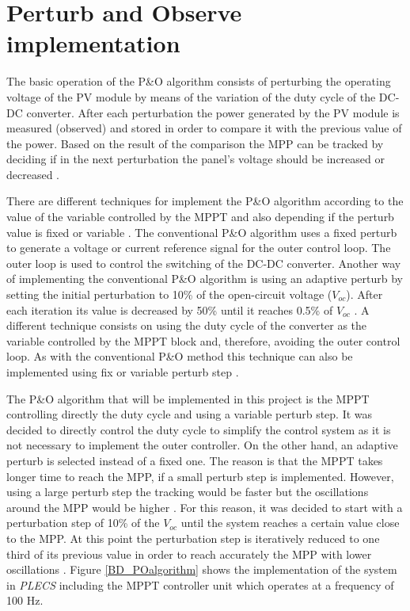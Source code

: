\section{Perturb and Observe implementation}\label{MPPTImplementation}

The basic operation of the P\&O algorithm consists of perturbing the operating voltage of the PV module by means of the variation of the duty cycle of the DC-DC converter. After each perturbation the power generated by the PV module is measured (observed) and stored in order to compare it with the previous value of the power. Based on the result of the comparison the MPP can be tracked by deciding if in the next perturbation the panel's voltage should be increased or decreased .

There are different techniques for implement the P\&O algorithm according to the value of the variable controlled by the MPPT and also depending if the perturb value is fixed or variable \cite{implementationPandO}. The conventional P\&O algorithm uses a fixed perturb to generate a voltage or current reference signal for the outer control loop. The outer loop is used to control the switching of the DC-DC converter. Another way of implementing the conventional P\&O algorithm is using an adaptive perturb by setting the initial perturbation to 10\% of the open-circuit voltage ($V_{oc}$). After each iteration its value is decreased by 50\% until it reaches 0.5\%
of $V_{oc}$ \cite{implementationPandO}. A different technique consists on using the duty cycle of the converter as the variable controlled by the MPPT block and, therefore, avoiding the outer control loop. As with the conventional P\&O method this technique can also be implemented using fix or variable perturb step \cite{implementationPandO}. 

The P\&O algorithm that will be implemented in this project is the MPPT controlling directly the duty cycle and using a variable perturb step. It was decided to directly control the duty cycle to simplify the control system as it is not necessary to implement the outer controller. On the other hand, an adaptive perturb is selected instead of a fixed one. The reason is that the MPPT takes longer time to reach the MPP, if a small perturb step is implemented. However, using a large perturb step the tracking would be faster but the oscillations around the MPP would be higher \cite{implementationPandO}. For this reason, it was decided to start with a perturbation step of 10\% of the $V_{oc}$ until the system reaches a certain value close to the MPP. At this point the perturbation step is iteratively reduced to one third of its previous value in order to reach accurately the MPP with lower oscillations . Figure \ref{BD_POalgorithm} shows the implementation of the system in \textit{PLECS} including the MPPT controller unit which operates at a frequency of 100 Hz. 

